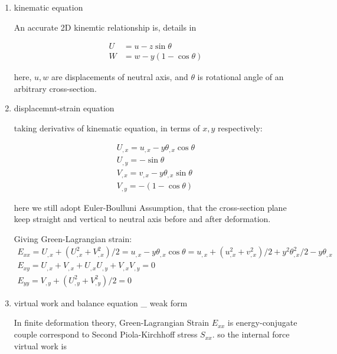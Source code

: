 \documentclass[11pt]{article}
\begin{document}
\begin{enumerate}

\item{kinematic equation}

An accurate 2D kinemtic relationship is, details in \cite[p.~215]{limingrui}

\begin{subequations}
 \begin{align}
	U &= u - z \sin \theta \\
	W &= w - y(1- \cos \theta)
  \end{align}
 \end{subequations}

here, $u, w$ are displacements of neutral axis, and $\theta$ is rotational angle of an arbitrary cross-section.

\item{displacemnt-strain equation}

taking derivativs of kinematic equation, in terms of $x,y$ respectively:

 \begin{subequations}
	\begin{align}
	U_{,x} = u_{,x} - y \theta_{,x} \cos \theta \\
	U_{,y} = - \sin \theta \\
	V_{,x} = v_{,x} - y \theta_{,x} \sin \theta \\
	V_{,y} = -(1- \cos \theta)
	\end{align}
\end{subequations}

here we still adopt Euler-Boulluni Assumption, that the cross-section plane keep straight and vertical to neutral axis before and after deformation.

Giving Green-Lagrangian strain:
 \begin{subequations}
	\begin{align}
	E_{xx} = U_{,x} + ( U_{,x}^2 + V_{,x}^2)/2 = u_{,x} - y \theta_{,x} \cos \theta = u_{,x} + ( u_{,x}^2 + v_{,x}^2)/2 + y^2 \theta_{,x}^2/2 - y \theta_{,x}  \\
	E_{xy} = U_{,x} + V_{,x} + U_{,x} U_{,y} + V_{,x} V_{,y} = 0 \\ 
	E_{yy} = V_{,y} + ( U_{,y}^2 + V_{,y}^2)/2 = 0
	\end{align}
\end{subequations}

\item{virtual work and balance equation \_  weak form}

In finite deformation theory, Green-Lagrangian Strain $E_{xx}$ is energy-conjugate couple correspond to Second Piola-Kirchhoff stress $S_{xx}$. so the internal force virtual work is


\end{enumerate}
\end{document}
